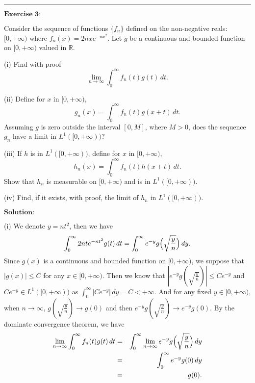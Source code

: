 \documentclass[12pt]{article}
\begin{document}
\noindent\rule[0.25\baselineskip]{\textwidth}{0.5pt}

\vspace{8pt}

$\textbf{Exercise 3:}$

Consider the sequence of functions $\{f_{n}\}$ defined on the non-negative reals: $[0, + \infty)$ where $f_{n}(x) = 2 n x e^{-n x^{2}}$. Let $g$ be a continuous and bounded function on $[0, + \infty)$ valued in $\mathbb{R}$.

(i) Find with proof
\begin{equation*}
   \lim_{n \to \infty} \int_{0}^{\infty} f_{n}(t) g(t) \, d t.
\end{equation*}

(ii) Define for $x$ in $[0, + \infty)$,
\begin{equation*}
   g_{n}(x) = \int_{0}^{\infty} f_{n} (t) g(x + t) \, d t.
\end{equation*}
Assuming $g$ is zero outside the interval $[0, M]$, where $M > 0$, does the sequence $g_{n}$ have a limit in $L^{1}([0, + \infty))$?

(iii) If $h$ is in $L^{1}([0, + \infty))$, define for $x$ in $[0, + \infty)$,
\begin{equation*}
   h_{n}(x) = \int_{0}^{\infty} f_{n} (t) h(x + t) \, d t.
\end{equation*}
Show that $h_{n}$ is measurable on $[0, + \infty)$ and is in $L^{1} ([0, + \infty))$.

(iv) Find, if it exists, with proof, the limit of $h_{n}$ in $L^{1} ([0, + \infty))$.


\vspace{8pt}
$\textbf{Solution:}$

(i) We denote $y = n t^{2}$, then we have
\begin{equation*}
    \int_{0}^{\infty} 2 n t e^{- n t^{2}} g(t) \, d t = \int_{0}^{\infty} e^{-y} g \Big{(} \sqrt{\frac{y}{n}} \Big{)} \, d y.
\end{equation*}
Since $g(x)$ is a continuous and bounded function on $[0, + \infty)$, we suppose that $| g(x) | \leq C$ for any $x \in [0, + \infty)$. Then we know that $| e^{-y} g(\sqrt{\frac{y}{n}}) | \leq C e^{-y}$ and $C e^{-y} \in L^{1}([0, + \infty))$ as $\int_{0}^{\infty} | C e^{-y}| \, d y = C < + \infty$. And for any fixed $y \in [0, + \infty)$, when $n \to \infty$, $g(\sqrt{\frac{y}{n}}) \to g(0)$ and then $e^{-y} g(\sqrt{\frac{y}{n}}) \to e^{-y} g(0)$. By the dominate convergence theorem, we have
\begin{eqnarray*}
\lim_{n \to \infty} \int_{0}^{\infty} f_{n}(t) g(t) \, d t & = &  \int_{0}^{\infty} \lim_{n \to \infty} e^{-y} g \Big{(} \sqrt{\frac{y}{n}} \Big{)} \, d y \\
& = &  \int_{0}^{\infty} e^{-y} g(0) \, d y  \\
& = & g(0).
\end{eqnarray*}
\end{document}
